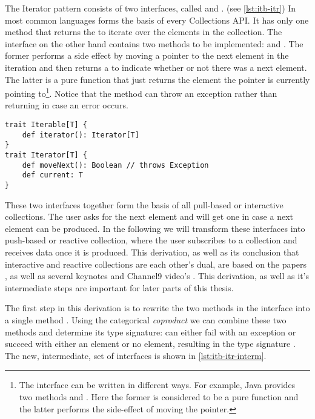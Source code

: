 The Iterator pattern consists of two interfaces, called \itb and \itr. (see \autoref{lst:itb-itr}) In most common languages \itb forms the basis of every Collections API. It has only one method  that returns the \itr to iterate over the elements in the collection. The \itr interface on the other hand contains two methods to be implemented:  and . The former performs a side effect by moving a pointer to the next element in the iteration and then returns a  to indicate whether or not there was a next element. The latter is a pure function that just returns the element the pointer is currently pointing to\footnote{The \itr interface can be written in different ways. For example, Java provides two methods  and . Here the former is considered to be a pure function and the latter performs the side-effect of moving the pointer.}. Notice that the  method can throw an exception rather than returning  in case an error occurs.

\begin{lstlisting}[caption={\itb and \itr interfaces}, label={lst:itb-itr}]
trait Iterable[T] {
    def iterator(): Iterator[T]
}
trait Iterator[T] {
    def moveNext(): Boolean // throws Exception
    def current: T
}
\end{lstlisting}

These two interfaces together form the basis of all pull-based or interactive collections. The user asks for the next element and will get one in case a next element can be produced. In the following we will transform these interfaces into push-based or reactive collection, where the user subscribes to a collection and receives data once it is produced. This derivation, as well as its conclusion that interactive and reactive collections are each other's dual, are based on the papers , as well as several keynotes and Channel9 video's . This derivation, as well as it's intermediate steps are important for later parts of this thesis.

The first step in this derivation is to rewrite the two methods in the \itr interface into a single method . Using the categorical \textit{coproduct}  we can combine these two methods and determine its type signature:  can either fail with an exception or succeed with either an element or no element, resulting in the type signature . The new, intermediate, set of interfaces is shown in \autoref{lst:itb-itr-interm}.


